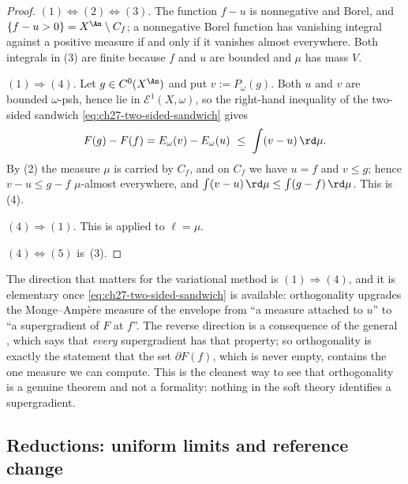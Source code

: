 \begin{proof}
\((1)\Leftrightarrow(2)\Leftrightarrow(3)\).  The function \(f-u\) is
nonnegative and Borel, and \(\{f-u>0\}=X^{\An}\setminus C_f\); a nonnegative
Borel function has vanishing integral against a positive measure if and only
if it vanishes almost everywhere.  Both integrals in (3) are finite because
\(f\) and \(u\) are bounded and \(\mu\) has mass \(V\).

\((1)\Rightarrow(4)\).  Let \(g\in C^0(X^{\An})\) and put
\(v:=P_\omega(g)\).  Both \(u\) and \(v\) are bounded \(\omega\)-psh, hence
lie in \(\mathcal E^1(X,\omega)\), so the right-hand inequality of the
two-sided sandwich \eqref{eq:ch27-two-sided-sandwich} gives
\[
 F(g)-F(f)=E_\omega(v)-E_\omega(u)\ \leq\ \int(v-u)\,\rd\mu .
\]
By (2) the measure \(\mu\) is carried by \(C_f\), and on \(C_f\) we have
\(u=f\) and \(v\leq g\); hence \(v-u\leq g-f\) \(\mu\)-almost everywhere,
and \(\int(v-u)\,\rd\mu\leq\int(g-f)\,\rd\mu\).  This is (4).

\((4)\Rightarrow(1)\).  This is
 applied to
\(\ell=\mu\).

\((4)\Leftrightarrow(5)\) is
\,(3).
\end{proof}

\begin{remark}
\label{rem:ch27-orthogonality-asymmetry}
The direction that matters for the variational method is
\((1)\Rightarrow(4)\), and it is elementary once
\eqref{eq:ch27-two-sided-sandwich} is available: orthogonality upgrades the
Monge--Amp\`ere measure of the envelope from ``a measure attached to \(u\)''
to ``a supergradient of \(F\) at \(f\)''.  The reverse direction is a
consequence of the general ,
which says that \emph{every} supergradient has that property; so
orthogonality is exactly the statement that the set
\(\partial F(f)\), which is never empty, contains the one measure we can
compute.  This is the cleanest way to see that orthogonality is a genuine
theorem and not a formality: nothing in the soft theory identifies a
supergradient.
\end{remark}

\subsection{Reductions: uniform limits and reference change}
\label{sec:ch27-orthogonality-reductions}

